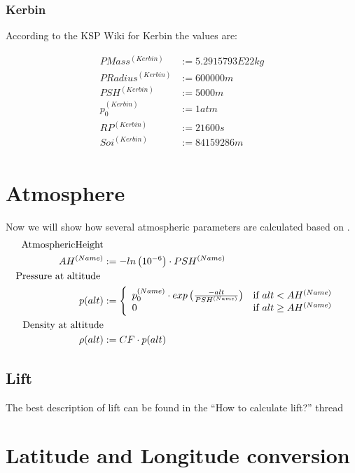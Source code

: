 \documentclass[11pt]{article}
\begin{document}
\subsubsection{Kerbin}

According to the KSP Wiki for Kerbin the values are:

\begin{align*}
  PMass^{(Kerbin)} &:= 5.2915793E22 kg\\
  PRadius^{(Kerbin)} &:= 600000 m\\
  PSH^{(Kerbin)} &:= 5000 m\\
  p_0^{(Kerbin)} &:= 1 atm\\
  RP^{(Kerbin)} &:= 21600 s\\
  Soi^{(Kerbin)} &:= 84159286 m\\
\end{align*}

\section{Atmosphere}

Now we will show how several atmospheric parameters are calculated
based on \cite{Atmo}.
\begin{align}
  \textrm{AtmosphericHeight}\nonumber\\
  AH^{(Name)} &:= -ln\left(10^{-6}\right)\cdot PSH^{(Name)}\\
  \textrm{Pressure at altitude }&\nonumber\\
  p(alt) &:=
  \left\{
      \begin{array}{l l}
        p_0^{(Name)} \cdot exp\left({\frac{-alt}{PSH^{(Name)}}}\right) & \textrm{if } alt < AH^{(Name)}\\
        0 &\textrm{if } alt \geq AH^{(Name)}
      \end{array}
    \right.\\
    \textrm{Density at altitude}\nonumber\\
    \rho(alt) &:= CF \cdot p(alt)
\end{align}


\subsection{Lift}

The best description of lift can be found in the ``How to calculate
lift?'' thread \cite{Lift}

\section{Latitude and Longitude conversion}
\end{document}
